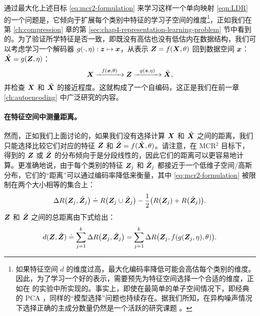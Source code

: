 \documentclass[../../book-main_zh.tex]{subfiles}
\begin{document}
{通过最大化上述目标 \eqref{eq:mcr2-formulation} 来学习这样一个单向映射 \eqref{eqn:LDR} 的一个问题是，它倾向于扩展每个类别中特征的学习子空间的维度\footnote{如果特征空间 $d$ 的维度过高，最大化编码率降低可能会高估每个类别的维度。因此，为了学习一个好的表示，需要预先为特征空间选择一个合适的维度，正如在 \cite{yu2020learning} 的实验中所实现的。事实上，即使在最简单的单子空间情况下，即经典的 PCA \cite{Jolliffe1986}，同样的“模型选择”问题也持续存在。据我们所知，在异构噪声情况下选择正确的主成分数量仍然是一个活跃的研究课题 \cite{hong2020selecting}。}，正如我们在第 \ref{ch:compression} 章的第 \ref{sec:chap4-representation-learning-problem} 节中看到的。为了验证所学特征是否一致，即既没有高估也没有低估内在数据结构，我们可以考虑学习一个解码器 $g(\cdot,\eta): \bm{z} \mapsto  \bm{x}$，从表示 $\bm{Z} = f(\bm{X},\theta)$ 回到数据空间 $\bm{x}$：$\hat {\bm{X}} = g(\bm{Z}, \eta)$：
\begin{equation}
    \bm{X} \xrightarrow{\hspace{2mm} f(\bm{x}, \theta)\hspace{2mm}} \bm{Z} \xrightarrow{\hspace{2mm} g(\bm{z},\eta) \hspace{2mm}} \hat {\bm{X}}, 
    \label{eqn:autoencoding-ch6}
\end{equation}
并检查 $\bm{X}$ 和 $\hat {\bm{X}}$ 的接近程度。这就构成了一个自编码，这正是我们在前一章 \ref{ch:autoencoding} 中广泛研究的内容。

\paragraph{在特征空间中测量距离。}
然而，正如我们上面讨论的，如果我们没有选择计算 $\bm{X}$ 和 $\hat {\bm{X}}$ 之间的距离，我们只能选择比较它们对应的特征 $\bm{Z}$ 和 $\hat {\bm{Z}} = f(\hat {\bm{X}}, \theta)$。请注意，在 MCR$^2$ 目标下，得到的 $\bm{Z}$ 或 $\hat {\bm{Z}}$ 的分布倾向于是分段线性的，因此它们的距离可以更容易地计算。更准确地说，由于每个类别的特征 $\bm{Z}_j$ 和 $\hat{\bm{Z}}_j$ 都接近于一个低维子空间/高斯分布，它们的“距离”可以通过编码率降低来衡量，{其中 \eqref{eq:mcr2-formulation} 被限制在两个大小相等的集合上}：
\begin{equation}
\Delta R\big(\bm{Z}_j, \hat{\bm{Z}}_j\big) \doteq R\big(\bm{Z}_j \cup \hat{\bm{Z}}_j\big) - \frac{1}{2} \big( R\big(\bm{Z}_j) + R\big(\hat {\bm{Z}}_j)\big).
\end{equation}
$\bm{Z}$ 和 $\hat {\bm{Z}}$ 之间的总距离由下式给出：
\begin{equation}
d(\bm{Z}, \hat {\bm{Z}}) \doteq   \sum_{j=1}^k \Delta R\big(\bm{Z}_j, \hat{\bm{Z}}_j\big) =  \sum_{j=1}^k \Delta R\big(\bm{Z}_j, f(g(\bm{Z}_j, \eta),\theta)\big).
\label{eqn:Z-distance}
\end{equation}


}
\end{document}
